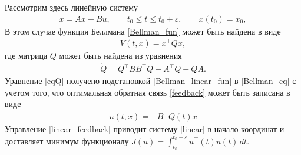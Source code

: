 Рассмотрим здесь линейную систему
\begin{gather}\label{linear}
	\dot{x} =  A  x + B u, \qquad t_0 \leqslant t \leqslant t_0 + \varepsilon, \qquad x(t_0) = x_0,
\end{gather}
В этом случае функция Беллмана \eqref{Bellman_fun} может быть найдена в виде 
\begin{gather}\label{Bellman_linear_fun}
	V(t,x) = x^{\top} Q x,
\end{gather}
где матрица  $ Q $ может быть найдена из уравнения 
\begin{gather}\label{eqQ}
	\dot{Q}  = Q^{\top} B B^{\top} Q - A^{\top}Q - Q A .
\end{gather}
Уравнение \eqref{eqQ} получено подстановкой \eqref{Bellman_linear_fun} в \eqref{Bellman_eq} с учетом того, что оптимальная обратная связь \eqref{feedback} может быть записана в виде
\begin{gather}\label{linear_feedback}
	u(t,x) = -B^{\top} Q(t) x
\end{gather}
Управление \eqref{linear_feedback} приводит систему \eqref{linear} в начало координат и доставляет минимум функционалу $ J(u)  =\displaystyle{\int_{t_0}^{t_0+\varepsilon}} u^{\top}(t) u(t) \, dt $.








\vspace{1ex}

\makeatletter
\@fundingrus\par
{}
\renewcommand{\section}{\@startsection{section}{1}{0pt}{1.3ex
plus 1ex minus 1ex}{1.3ex plus .1ex}{}}

